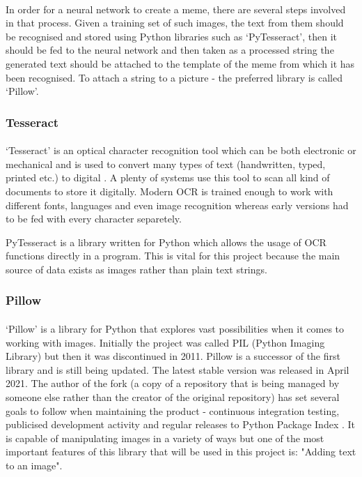 \documentclass[12pt]{report}
\begin{document}
    \paragraph{}

    In order for a neural network to create a meme, there are several steps involved in that process. Given a training set of such images, the text from them should be recognised and stored using Python libraries such as `PyTesseract', then it should be fed to the neural network and then taken as a processed string
    the generated text should be attached to the template of the meme from which it has been recognised. To attach a string to a picture - the preferred library is called `Pillow'.

    \subsubsection{Tesseract}
    \paragraph{}

    `Tesseract' is an optical character recognition tool which can be both electronic or mechanical and is used to convert many types of text (handwritten, typed, printed etc.) to digital \citep{tesseract_article}. A plenty of systems use this tool to scan all kind of documents to store it digitally.
    Modern OCR is trained enough to work with different fonts, languages and even image recognition whereas early versions had to be fed with every character separetely.

    PyTesseract is a library written for Python which allows the usage of OCR functions directly in a program. This is vital for this project because the main source of data exists as images rather than plain text strings.

    \subsubsection{Pillow}
    \paragraph{}

    `Pillow' is a library for Python that explores vast possibilities when it comes to working with images. Initially the project was called PIL (Python Imaging Library) but then it was discontinued in 2011.
    Pillow is a successor of the first library and is still being updated. The latest stable version was released in April 2021. The author of the fork (a copy of a repository that is being managed by someone else rather than the creator of the original repository) has set several goals to follow when maintaining the product - continuous integration testing, publicised development activity and regular releases to Python Package Index \citep{pillow_about}. 
    It is capable of manipulating images in a variety of ways but one of the most important features of this library that will be used in this project is: "Adding text to an image".
\end{document}
